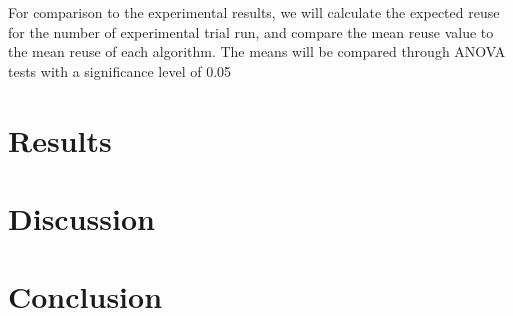 For comparison to the experimental results, we will calculate the expected reuse for the number of experimental trial run, and compare the mean reuse value to the mean reuse of each algorithm. The means will be compared through ANOVA tests with a significance level of 0.05  
\section{Results}
\section{Discussion}
\section{Conclusion}
